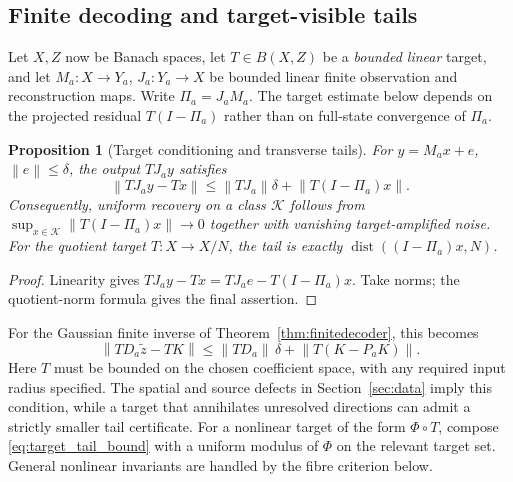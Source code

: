 \documentclass[11pt,a4paper]{amsart}
\numberwithin{equation}{section}
\newtheorem{proposition}[theorem]{Proposition}
\theoremstyle{definition}
\theoremstyle{remark}
\DeclareMathOperator{\dist}{dist}
\newcommand{\norm}[1]{\left\lVert#1\right\rVert}
\begin{document}
\subsection{Finite decoding and target-visible tails}
Let $X,Z$ now be Banach spaces, let $T\in B(X,Z)$ be a \emph{bounded linear} target, and let $M_a:X\to Y_a$, $J_a:Y_a\to X$ be bounded linear finite observation and reconstruction maps. Write $\Pi_a=J_aM_a$. The target estimate below depends on the projected residual $T(I-\Pi_a)$ rather than on full-state convergence of $\Pi_a$.
\begin{proposition}[Target conditioning and transverse tails]\label{prop:target_tail}
For $y=M_ax+e$, $\norm e\le\delta$, the output $TJ_ay$ satisfies
\begin{equation}\label{eq:target_tail_bound}
 \norm{TJ_ay-Tx}\le\norm{TJ_a}\delta+\norm{T(I-\Pi_a)x}.
\end{equation}
Consequently, uniform recovery on a class $\mathcal K$ follows from
$\sup_{x\in\mathcal K}\norm{T(I-\Pi_a)x}\to0$ together with vanishing target-amplified noise. For the quotient target $T:X\to X/N$, the tail is exactly
$\dist((I-\Pi_a)x,N)$.
\end{proposition}
\begin{proof}
Linearity gives $TJ_ay-Tx=TJ_ae-T(I-\Pi_a)x$. Take norms; the quotient-norm formula gives the final assertion.
\end{proof}

For the Gaussian finite inverse of Theorem~\ref{thm:finitedecoder}, this becomes
\[
 \norm{TD_a\widetilde z-TK}
 \le\norm{TD_a}\,\delta+\norm{T(K-P_aK)}.
\]
Here $T$ must be bounded on the chosen coefficient space, with any required input radius specified. The spatial and source defects in Section~\ref{sec:data} imply this condition, while a target that annihilates unresolved directions can admit a strictly smaller tail certificate. For a nonlinear target of the form $\Phi\circ T$, compose \eqref{eq:target_tail_bound} with a uniform modulus of $\Phi$ on the relevant target set. General nonlinear invariants are handled by the fibre criterion below.
\end{document}
